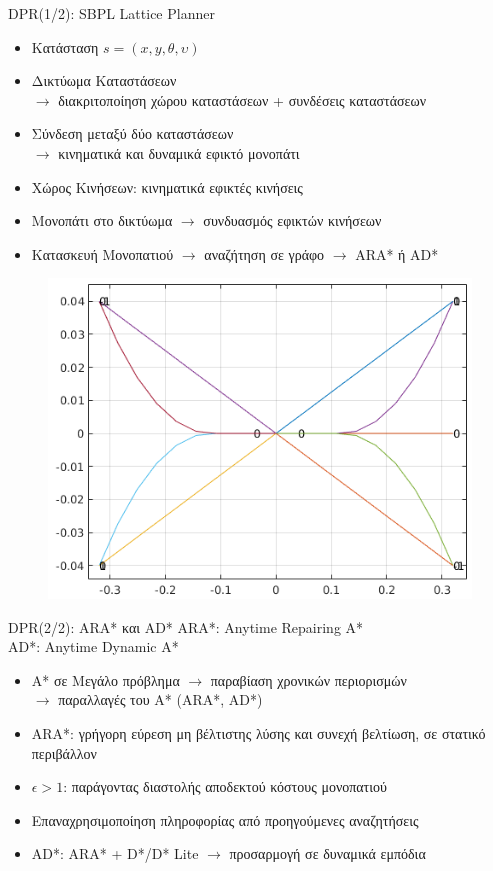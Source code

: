 \documentclass[10pt, compress]{beamer}
\begin{document}
\begin{frame}{DPR(1/2): SBPL Lattice Planner}
	\begin{itemize}
		\item Κατάσταση $s=(x,y,\theta,\upsilon)$
		\item Δικτύωμα Καταστάσεων\\$\rightarrow$ διακριτοποίηση χώρου καταστάσεων + συνδέσεις καταστάσεων
		\item Σύνδεση μεταξύ δύο καταστάσεων\\$\rightarrow$ κινηματικά και δυναμικά εφικτό μονοπάτι
		\item Χώρος Κινήσεων: κινηματικά εφικτές κινήσεις
		\item Μονοπάτι στο δικτύωμα $\rightarrow$ συνδυασμός εφικτών κινήσεων
		\item Κατασκευή Μονοπατιού $\rightarrow$ αναζήτηση σε γράφο $\rightarrow$ ARA* ή AD*
	\end{itemize}
	\begin{figure}
		\includegraphics[width=0.45\linewidth]{Figures/motion_primitives.png}
	\end{figure}
\end{frame}

\begin{frame}{DPR(2/2): ARA* και AD*}
	ARA*: Anytime Repairing A*\\
	AD*: Anytime Dynamic A*
	
	\begin{itemize}
		\item A* σε Μεγάλο πρόβλημα $\rightarrow$ παραβίαση χρονικών περιορισμών\\$\rightarrow$  παραλλαγές του A* (ARA*, AD*)
		\item ARA*: γρήγορη εύρεση μη βέλτιστης λύσης και συνεχή βελτίωση, σε στατικό περιβάλλον
		\item $\epsilon>1$: παράγοντας διαστολής αποδεκτού κόστους μονοπατιού
		\item Επαναχρησιμοποίηση πληροφορίας από προηγούμενες αναζητήσεις
		\item AD*: ARA* + D*/D* Lite $\rightarrow$ προσαρμογή σε δυναμικά εμπόδια
	\end{itemize}
	
\end{frame}

\end{document}
